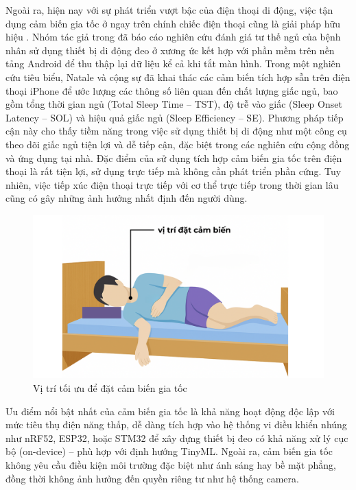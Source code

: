 Ngoài ra, hiện nay với sự phát triển vượt bậc của điện thoại di động, việc tận
dụng cảm biến gia tốc ở ngay trên chính chiếc điện thoại cũng là giải pháp hữu
hiệu \cite{sun2017sleepmonitor}. Nhóm tác giả trong \cite{Ferrer_osa} đã báo
cáo nghiên cứu đánh giá tư thế ngủ của bệnh nhân sử dụng thiết bị di động đeo ở
xương ức kết hợp với phần mềm trên nền tảng Android để thu thập lại dữ liệu kể
cả khi tắt màn hình. Trong một nghiên cứu tiêu biểu, Natale và cộng sự đã khai
thác các cảm biến tích hợp sẵn trên điện thoại iPhone để ước lượng các thông số
liên quan đến chất lượng giấc ngủ, bao gồm tổng thời gian ngủ (Total Sleep Time
– TST), độ trễ vào giấc (Sleep Onset Latency – SOL) và hiệu quả giấc ngủ (Sleep
Efficiency – SE). Phương pháp tiếp cận này cho thấy tiềm năng trong việc sử
dụng thiết bị di động như một công cụ theo dõi giấc ngủ tiện lợi và dễ tiếp
cận, đặc biệt trong các nghiên cứu cộng đồng và ứng dụng tại
nhà\cite{Natale_osa}. Đặc điểm của sử dụng tích hợp cảm biến gia tốc trên điện
thoại là rất tiện lợi, sử dụng trực tiếp mà không cần phát triển phần cứng. Tuy
nhiên, việc tiếp xúc điện thoại trực tiếp với cơ thể trực tiếp trong thời gian
lâu cũng có gây những ảnh hưởng nhất định đến người dùng.

\begin{figure}[!ht]
  \centering
  \includegraphics[width=\textwidth]{images/vị trí đặt cảm biến.png}
  \vspace*{-7mm}
  \caption{Vị trí tối ưu để đặt cảm biến gia tốc}
  \label{position_sensor}
\end{figure}

Ưu điểm nổi bật nhất của cảm biến gia tốc là khả năng hoạt động độc lập
với mức tiêu thụ điện năng thấp, dễ dàng tích hợp vào hệ thống vi điều
khiển nhúng như nRF52, ESP32, hoặc STM32 để xây dựng thiết bị đeo có khả
năng xử lý cục bộ (on-device) – phù hợp với định hướng TinyML.
Ngoài ra, cảm biến gia tốc không yêu cầu điều kiện môi trường đặc
biệt như ánh sáng hay bề mặt phẳng, đồng thời không ảnh hưởng đến
quyền riêng tư như hệ thống camera.

